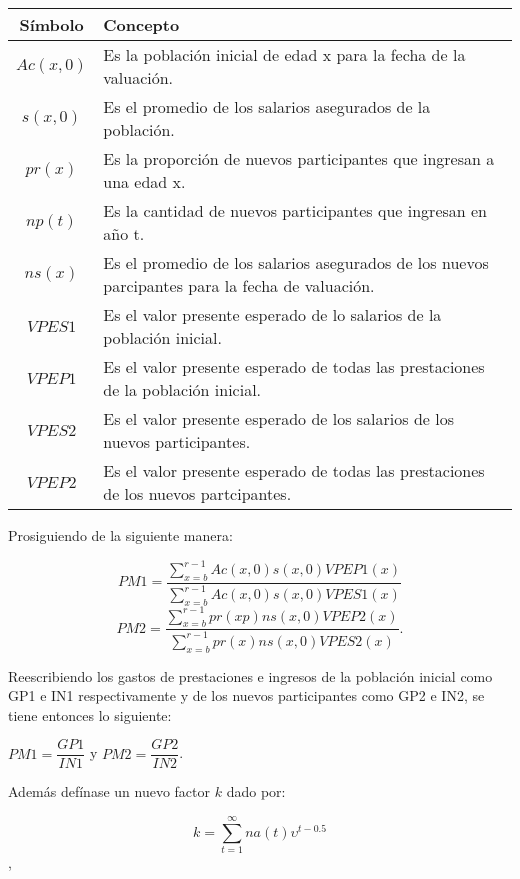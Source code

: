 \documentclass[12pt,letterpaper,titlepage]{article}
\begin{document}
{\begin{center}
	\begin{tabular}{|c||p{12cm}|}
		\hline 
		Símbolo & Concepto \\ 
		\hline 
		\hline 
		$Ac(x,0)$ & Es la población inicial de edad x para la fecha de la valuación. \\ 
		\hline 
		$s(x,0)$ & Es el promedio de los salarios asegurados de la población. \\ 
		\hline 
		$pr(x)$ & Es la proporción de nuevos participantes que ingresan a una edad x. \\ 
		\hline 
		$np(t)$ & Es la cantidad de nuevos participantes que ingresan en año t. \\ 
		\hline 
		$ns(x)$ & Es el promedio de los salarios asegurados de los nuevos parcipantes para la fecha de valuación. \\ 
		\hline 
		$V\!PES1$ & Es el valor presente esperado de lo salarios de la población inicial. \\ 
		\hline 
		$V\!PEP1$ & Es el valor presente esperado de todas las prestaciones de la población inicial. \\ 
		\hline 
		$V\!PES2$ & Es el valor presente esperado de los salarios de los nuevos participantes. \\ 
		\hline 
		$V\!PEP2$ & Es el valor presente esperado de todas las prestaciones de los nuevos partcipantes. \\ 
		\hline
	\end{tabular} 
\end{center}

Prosiguiendo de la siguiente manera:

\[ PM1=\dfrac{\sum\limits_{x=b}^{r-1}Ac(x,0)s(x,0)V\!PEP1(x)}{\sum\limits_{x=b}^{r-1}Ac(x,0)s(x,0)V\!PES1(x)} \]
\[ PM2=\dfrac{\sum\limits_{x=b}^{r-1}pr(xp)ns(x,0)V\!PEP2(x)}{\sum\limits_{x=b}^{r-1}pr(x)ns(x,0)V\!PES2(x)}. \]

Reescribiendo los gastos de prestaciones e ingresos de la población inicial como GP1 e IN1 respectivamente y de los nuevos participantes como GP2 e IN2, se tiene entonces lo siguiente:

\begin{center}
	$ PM1=\dfrac{GP1}{IN1} $      y       $ PM2=\dfrac{GP2}{IN2} $.
\end{center} 

Además defínase un nuevo factor $k$ dado por:
\begin{center}
	\[ k=\sum\limits_{t=1}^{\infty}na(t)\upsilon^{t-0.5} \],
\end{center}

}
\end{document}
